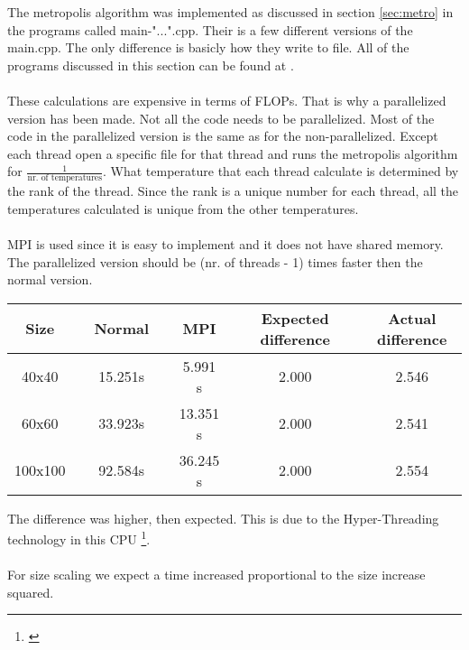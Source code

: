 The metropolis algorithm was implemented as discussed in section \ref{sec:metro} in the programs called main-"...".cpp. Their is a few different versions of the main.cpp. The only difference is basicly how they write to file. All of the programs discussed in this section can be found at \href{https://github.com/erikfsk/Project-4/tree/master/Project4}{\color{blue}{github}}.
\\
\\
These calculations are expensive in terms of FLOPs. That is why a parallelized version has been made. Not all the code needs to be parallelized. Most of the code in the parallelized version is the same as for the non-parallelized. Except each thread open a specific file for that thread and runs the metropolis algorithm for $\frac{1}{\text{nr. of temperatures}}$. What temperature that each thread calculate is determined by the rank of the thread. Since the rank is a unique number for each thread, all the temperatures calculated is unique from the other temperatures. 
\\
\\
MPI is used since it is easy to implement and it does not have shared memory. The parallelized version should be (nr. of threads - 1) times faster then the normal version.

\begin{center}
\label{tab:parallell}
\begin{tabularx}{\textwidth}{c X c X c X c X c}
    \hline 
    \hline 
        Size && Normal && MPI && Expected difference && Actual difference\\ 
    \hline
        40x40   	&&      15.251s	&&		5.991 s 	&&	2.000	&&	2.546	\\  
        60x60   	&&      33.923s	&&		13.351 s	&&	2.000	&&	2.541	\\
        100x100   	&&      92.584s	&&		36.245 s	&&	2.000	&&	2.554	\\
    \hline
\end{tabularx}
\end{center}

The difference was higher, then expected. This is due to the Hyper-Threading technology in this CPU \footnote{\href{https://www.intel.com/content/www/us/en/architecture-and-technology/hyper-threading/hyper-threading-technology.html}{\color{blue}{Intel Hyper-Threading Technology}}}. 
\\
\\
For size scaling we expect a time increased proportional to the size increase squared. 

